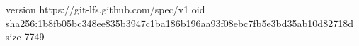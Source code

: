 version https://git-lfs.github.com/spec/v1
oid sha256:1b8fb05bc348ee835b3947c1ba186b196aa93f08ebc7fb5e3bd35ab10d82718d
size 7749
